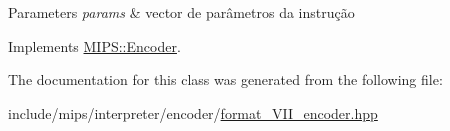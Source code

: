 \begin{DoxyParams}{Parameters}
{\em params} & vector de parâmetros da instrução \\
\hline
\end{DoxyParams}


Implements \hyperlink{classMIPS_1_1Encoder_a4a29c42d601460be8e8d353d8fc0da34}{M\+I\+P\+S\+::\+Encoder}.



The documentation for this class was generated from the following file\+:\begin{DoxyCompactItemize}
\item 
include/mips/interpreter/encoder/\hyperlink{format__VII__encoder_8hpp}{format\+\_\+\+V\+I\+I\+\_\+encoder.\+hpp}\end{DoxyCompactItemize}
